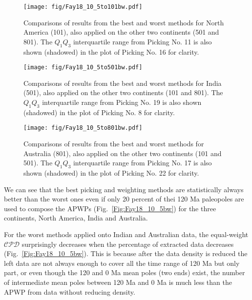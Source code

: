 \begin{figure}
    \centering
        \texttt{[image: fig/Fay18\_10\_5to101bw.pdf]}
    \captionsetup{width=.95\textwidth}
    \caption{Comparisons of results from the best and worst methods for North
	America (101), also applied on the other two continents (501 and 801). The
	$Q_1$\textendash$Q_3$ interquartile range from Picking No. 11 is also shown
	(shadowed) in the plot of Picking No. 16 for clarity.}\label{Fig:Fay18_10_5to101bw}
\end{figure}

\begin{figure}
    \centering
        \texttt{[image: fig/Fay18\_10\_5to501bw.pdf]}
    \captionsetup{width=.95\textwidth}
	\caption{Comparisons of results from the best and worst methods for India
	(501), also applied on the other two continents (101 and 801). The
	$Q_1$\textendash$Q_3$ interquartile range from Picking No. 19 is also shown
	(shadowed) in the plot of Picking No. 8 for clarity.}\label{Fig:Fay18_10_5to501bw}
\end{figure}

\begin{figure}
    \centering
        \texttt{[image: fig/Fay18\_10\_5to801bw.pdf]}
    \captionsetup{width=.95\textwidth}
    \caption{Comparisons of results from the best and worst methods for
	Australia (801), also applied on the other two continents (101 and 501). The
	$Q_1$\textendash$Q_3$ interquartile range from Picking No. 17 is also shown
	(shadowed) in the plot of Picking No. 22 for clarity.}\label{Fig:Fay18_10_5to801bw}
\end{figure}

We can see that the best picking and weighting methods are statistically always
better than the worst ones even if only 20 percent of thei 120 Ma
paleopoles are used to compose the APWPs (Fig.~\ref{Fig:Fay18_10_5bw}) for the
three continents, North America, India and Australia.

For the worst methods applied onto Indian and Australian data, the equal-weight
$\mathcal{CPD}$ surprisingly decreases when the percentage of extracted data
decreases (Fig.~\ref{Fig:Fay18_10_5bw}). This is because after the data density
is reduced the left data are not always enough to cover all the time range of
120 Ma but only part, or even though the 120 and 0 Ma mean poles
(two ends) exist, the number of intermediate mean poles between 120 Ma and 0 Ma
is much less than the APWP from data without reducing density.

